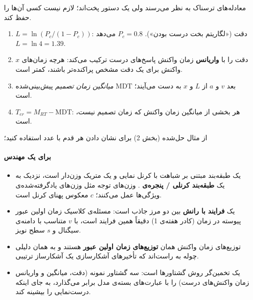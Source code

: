 معادله‌های  ترسناک به نظر می‌رسند ولی یک دستور پخت‌اند؛ لازم نیست
کسی آن‌ها را حفظ کند.

\begin{enumerate}
\def\labelenumi{\arabic{enumi}.}
\tightlist
\item
  \(L = \ln(P_c/(1-P_c))\): \textbf{} دقت («لگاریتم بخت درست
  بودن»). \(P_c = 0.8\) می‌دهد \(L = \ln 4 = 1.39\).
\item
  \(x\) دقت را با \textbf{واریانس} زمان واکنش پاسخ‌های درست ترکیب می‌کند:
  هرچه زمان‌های واکنش برای یک دقت مشخص پراکنده‌تر باشند،  کمتر
  است.
\item
  بعد \(v\) و \(a\) از \(L\) و \(x\) به دست می‌آیند؛ \(\mathrm{MDT}\)
  \emph{میانگین زمان تصمیم} پیش‌بینی‌شده است.
\item
  \(T_{er} = M_{RT} - \mathrm{MDT}\): هر بخشی از میانگین زمان واکنش که
  زمان تصمیم نیست،  است.
\end{enumerate}

از مثال حل‌شده (بخش 2) برای نشان دادن هر قدم با عدد استفاده کنید؛

\paragraph{برای یک مهندس}

\begin{itemize}
\tightlist
\item
  \textbf{} یک طبقه‌بند مبتنی بر شباهت با کرنل نمایی و یک متریک
   وزن‌دار  است، نزدیک به یک \textbf{طبقه‌بند
  کرنلی / پنجره‌ی }. وزن‌های توجه مثل وزن‌های یادگرفته‌شده‌ی
  ویژگی‌ها عمل می‌کنند؛ \(c\) معکوس پهنای کرنل است.
\item
  \textbf{} یک \textbf{فرایند  با رانش} بین دو مرز
  جاذب است: مسئله‌ی کلاسیک زمان اولین عبور  پیوسته در زمان (کادر هفته‌ی 1) دقیقاً همین فرایند است، با \(v\)
  متناسب با دامنه‌ی سیگنال و \(s\) سطح نویز.
\item
  توزیع‌های زمان واکنش همان \textbf{توزیع‌های زمان اولین عبور} هستند و به
  همان دلیلی چوله به راست‌اند که تأخیرهای آشکارسازی یک آشکارساز ترتیبی.
\item
  \textbf{} یک تخمین‌گر روش گشتاورها  است: سه گشتاور نمونه (دقت، میانگین و واریانس زمان واکنش‌های
  درست) را با عبارت‌های بسته‌ی مدل برابر می‌گذارد، به جای اینکه درست‌نمایی
  را بیشینه کند.
\end{itemize}

